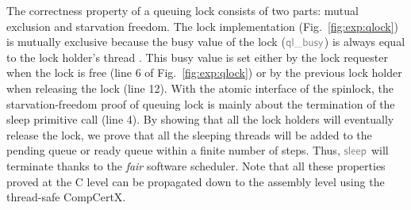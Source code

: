The correctness property of a queuing lock consists of
two parts: mutual exclusion and starvation freedom.
The lock implementation (Fig.~\ref{fig:exp:qlock}) is mutually exclusive
because the busy value of the lock ($\commc{ql\_busy}$)
is always equal to the lock holder's thread \allid{}.
This busy value is set either
by the lock requester when the lock is free (line 6 of 
Fig.~\ref{fig:exp:qlock})
or by the previous lock holder when releasing the lock
(line 12).
With the atomic interface of the spinlock, the starvation-freedom proof of queuing lock
is mainly about the termination of the sleep primitive call
(line 4). By showing that all the lock holders
will eventually release the lock,
we prove that all the sleeping threads will be 
added to the pending queue or ready queue within a finite number
of steps. Thus, $\commc{sleep}$ will terminate
thanks to the \emph{fair} software scheduler.
Note that all these properties proved at the C level can be propagated down to the assembly level using the thread-safe CompCertX.
